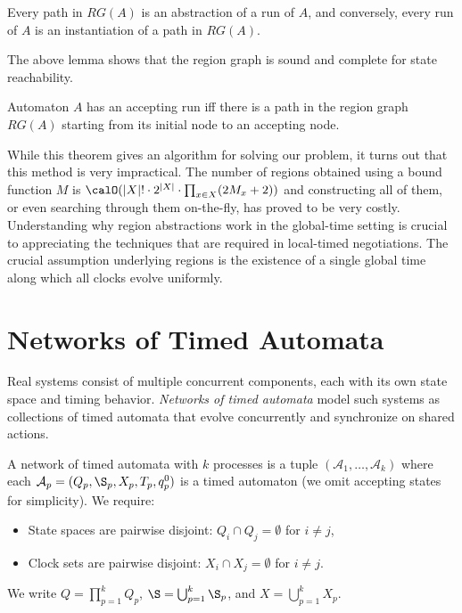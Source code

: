 \begin{lemma}
Every path in $RG(A)$ is an abstraction of a run of $A$, and conversely, every run of $A$ is an instantiation of a path in $RG(A)$.
\end{lemma}

The above lemma shows that the region graph is sound and complete for state reachability.

\begin{theorem}[\cite{}]
Automaton $A$ has an accepting run iﬀ there is a path in the region graph $RG(A)$ starting from its initial node to an accepting node.
\end{theorem}

While this theorem gives an algorithm for solving our problem, it turns out that this method is very impractical. The number of regions obtained using a bound function $M$ is $\calO (|X|! \cdot 2^{|X|} \cdot \prod_{x \in X} (2M_x + 2))$ \cite{} and constructing all of them, or even searching through them on-the-fly, has proved to be very costly. Understanding why region abstractions work in the global-time setting is crucial to appreciating the techniques that are required in local-timed negotiations. The crucial assumption underlying regions is the existence of a single global time along which all clocks evolve uniformly.


\section{Networks of Timed Automata}
\label{sec:networks-ta}

Real systems consist of multiple concurrent components, each with its own state space and timing behavior. \emph{Networks of timed automata} model such systems as collections of timed automata that evolve concurrently and synchronize on shared actions.

\begin{definition}
\label{def:network}
A \textsf{network of timed automata} with $k$ processes is a tuple $(\mathcal{A}_1, \ldots, \mathcal{A}_k)$ where each $\mathcal{A}_p = (Q_p, \S_p, X_p, T_p, q_p^0)$ is a timed automaton (we omit accepting states for simplicity). We require:
\begin{itemize}
\item State spaces are pairwise disjoint: $Q_i \cap Q_j = \emptyset$ for $i \neq j$,
\item Clock sets are pairwise disjoint: $X_i \cap X_j = \emptyset$ for $i \neq j$.
\end{itemize}
We write $Q = \prod_{p=1}^k Q_p$, $\S = \bigcup_{p=1}^k \S_p$, and $X = \bigcup_{p=1}^k X_p$.
\end{definition}


